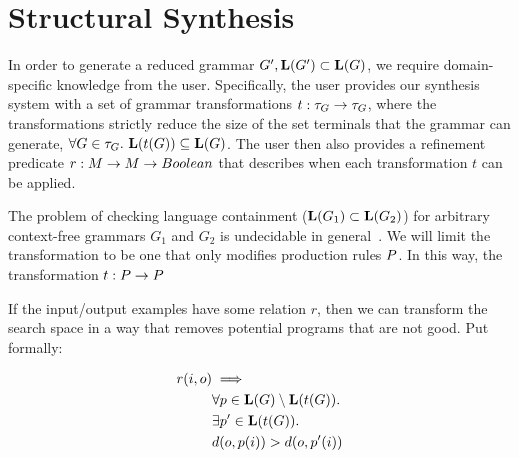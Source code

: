 \section{Structural Synthesis}
\label{sec:struct}
In order to generate a reduced grammar $G', \mathbf{L}(G') \subset \mathbf{L}(G)$, we require domain-specific knowledge from the user.
Specifically, the user provides our synthesis system with a set of grammar transformations \mbox{$t: \tau_{G} \to \tau_{G}$}, where the transformations strictly reduce the size of the set terminals that the grammar can generate, \mbox{$\forall G \in \tau_{G}. \ \mathbf{L}(t(G)) \subseteq \mathbf{L}(G)$}.
The user then also provides a refinement predicate $r: M \to M \to Boolean$ that describes when each transformation $t$ can be applied. 

The problem of checking language containment ($\mathbf{L}(G_{1}) \subset \mathbf{L}(G_{2})$) for arbitrary context-free grammars $G_1$ and $G_2$ is undecidable in general~\cite{hopcroft1969equivalence}.
We will limit the transformation to be one that only modifies production rules $P$.
In this way, the transformation $t: P \to P$ 


If the input/output examples have some relation $r$, then we can transform the search space in a way that removes potential programs that are not good.
Put formally:

\begin{align*}
   r(i,o) &\implies \\
   & \forall p \in \mathbf{L}(G) \setminus \mathbf{L}(t(G)). \\
   & \exists p' \in \mathbf{L}(t(G)). \\
   & {d}(o,p(i)) > {d}(o,p'(i)) 
\end{align*}

